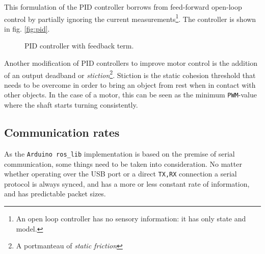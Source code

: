 \documentclass[11pt]{article}
\begin{document}
This formulation of the PID controller borrows from feed-forward open-loop control by partially ignoring the current measurements\footnote{An open loop controller has no sensory information: it has only state and model.}. The controller is shown in fig. \vref{fig:pid}. \par
\begin{figure}[htb]
  \centering
{}
\caption[PID controller with feedback]{PID controller with feedback term.}
\label{fig:pid}
\end{figure}\par
Another modification of PID controllers to improve motor control is the addition of an output deadband or \emph{stiction}\footnote{A portmanteau of \emph{static friction}}. Stiction is the static cohesion threshold that needs to be overcome in order to bring an object from rest when in contact with other objects. In the case of a motor, this can be seen as the minimum \texttt{PWM}-value where the shaft starts turning consistently.
\subsection{Communication rates}
\label{subsec:cr}
As the \texttt{Arduino ros\_lib} implementation is based on the premise of serial communication, some things need to be taken into consideration. No matter whether operating over the USB port or a direct \texttt{TX,RX} connection a serial protocol is always synced, and has a more or less constant rate of information, and has predictable packet sizes. \par
\end{document}
